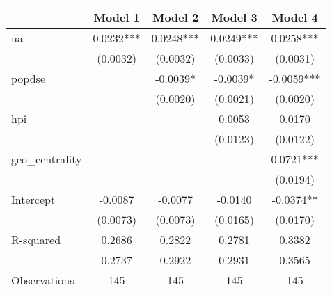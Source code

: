 \begin{table}
\caption{}
\begin{center}
\begin{tabular}{lcccc}
\hline
                &  Model 1  &  Model 2  &  Model 3  &  Model 4    \\
\midrule
ua              & 0.0232*** & 0.0248*** & 0.0249*** & 0.0258***   \\
                & (0.0032)  & (0.0032)  & (0.0033)  & (0.0031)    \\
popdse          &           & -0.0039*  & -0.0039*  & -0.0059***  \\
                &           & (0.0020)  & (0.0021)  & (0.0020)    \\
hpi             &           &           & 0.0053    & 0.0170      \\
                &           &           & (0.0123)  & (0.0122)    \\
geo\_centrality &           &           &           & 0.0721***   \\
                &           &           &           & (0.0194)    \\
Intercept       & -0.0087   & -0.0077   & -0.0140   & -0.0374**   \\
                & (0.0073)  & (0.0073)  & (0.0165)  & (0.0170)    \\
R-squared       & 0.2686    & 0.2822    & 0.2781    & 0.3382      \\
                & 0.2737    & 0.2922    & 0.2931    & 0.3565      \\
Observations    & 145       & 145       & 145       & 145         \\
\hline
\end{tabular}
\end{center}
\end{table}